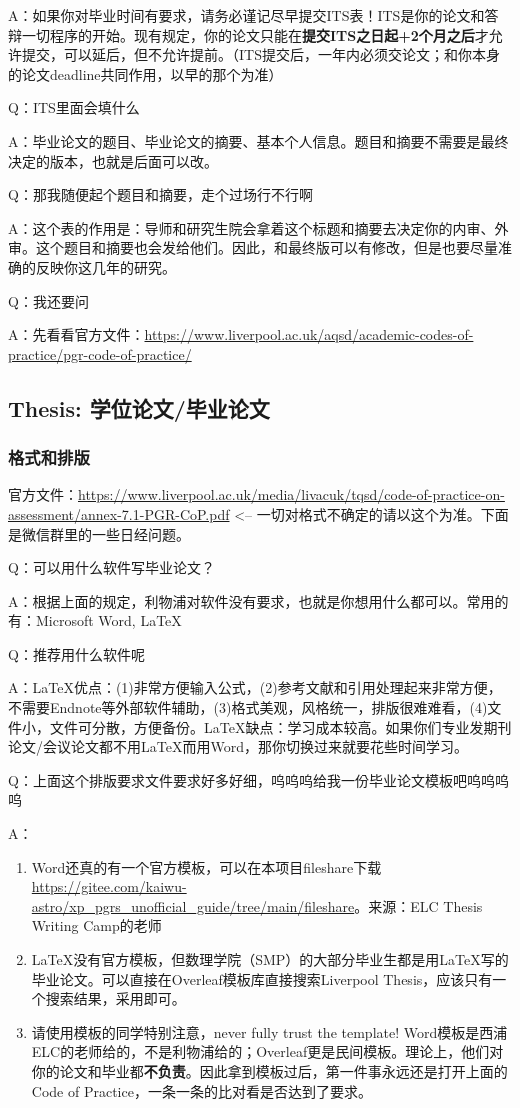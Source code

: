 A：如果你对毕业时间有要求，请务必谨记尽早提交ITS表！ITS是你的论文和答辩一切程序的开始。现有规定，你的论文只能在\textbf{提交ITS之日起+2个月之后}才允许提交，可以延后，但不允许提前。（ITS提交后，一年内必须交论文；和你本身的论文deadline共同作用，以早的那个为准）

Q：ITS里面会填什么

A：毕业论文的题目、毕业论文的摘要、基本个人信息。题目和摘要不需要是最终决定的版本，也就是后面可以改。

Q：那我随便起个题目和摘要，走个过场行不行啊

A：这个表的作用是：导师和研究生院会拿着这个标题和摘要去决定你的内审、外审。这个题目和摘要也会发给他们。因此，和最终版可以有修改，但是也要尽量准确的反映你这几年的研究。

Q：我还要问

A：先看看官方文件：\url{https://www.liverpool.ac.uk/aqsd/academic-codes-of-practice/pgr-code-of-practice/}

\subsection{Thesis: 学位论文/毕业论文}

\subsubsection{格式和排版}

官方文件：\url{https://www.liverpool.ac.uk/media/livacuk/tqsd/code-of-practice-on-assessment/annex-7.1-PGR-CoP.pdf}
<-- 一切对格式不确定的请以这个为准。下面是微信群里的一些日经问题。

Q：可以用什么软件写毕业论文？

A：根据上面的规定，利物浦对软件没有要求，也就是你想用什么都可以。常用的有：Microsoft Word, \LaTeX

Q：推荐用什么软件呢

A：\LaTeX 优点：(1)非常方便输入公式，(2)参考文献和引用处理起来非常方便，不需要Endnote等外部软件辅助，(3)格式美观，风格统一，排版很难难看，(4)文件小，文件可分散，方便备份。\LaTeX 缺点：学习成本较高。如果你们专业发期刊论文/会议论文都不用\LaTeX 而用Word，那你切换过来就要花些时间学习。

Q：上面这个排版要求文件要求好多好细，呜呜呜给我一份毕业论文模板吧呜呜呜呜

A：
\begin{enumerate}
    \item Word还真的有一个官方模板，可以在本项目fileshare下载\url{https://gitee.com/kaiwu-astro/xp_pgrs_unofficial_guide/tree/main/fileshare}。来源：ELC Thesis Writing Camp的老师
    \item \LaTeX 没有官方模板，但数理学院（SMP）的大部分毕业生都是用\LaTeX 写的毕业论文。可以直接在Overleaf模板库直接搜索Liverpool Thesis，应该只有一个搜索结果，采用即可。
    \item 请使用模板的同学特别注意，never fully trust the template! Word模板是西浦ELC的老师给的，不是利物浦给的；Overleaf更是民间模板。理论上，他们对你的论文和毕业都\textbf{不负责}。因此拿到模板过后，第一件事永远还是打开上面的Code of Practice，一条一条的比对看是否达到了要求。
\end{enumerate}

